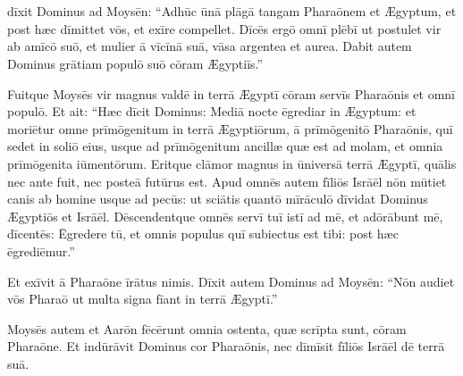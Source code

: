 \chapter{}


\thispagestyle{empty}

 dīxit Dominus ad Moysēn: ``Adhūc ūnā
plāgā tangam Pharaōnem et Ægyptum, et post
hæc dīmittet vōs, et exīre compellet. Dīcēs ergō omnī
plēbī ut postulet vir ab amīcō suō, et mulier ā
vīcīnā suā, vāsa argentea et aurea. Dabit autem Dominus
grātiam populō suō cōram Ægyptiīs.''

Fuitque Moysēs vir
magnus valdē in terrā Ægyptī cōram servīs Pharaōnis et omnī
populō. Et ait: ``Hæc dīcit Dominus: Mediā nocte ēgrediar in Ægyptum: 
et moriētur omne prīmōgenitum in terrā Ægyptiōrum, ā
prīmōgenitō Pharaōnis, quī sedet in soliō eius, usque ad
prīmōgenitum ancillæ quæ est ad molam, et omnia
prīmōgenita iūmentōrum. Eritque clāmor magnus
in ūniversā terrā Ægyptī, quālis nec ante fuit, nec posteā futūrus est. 
Apud omnēs autem fīliōs Isrāēl nōn mūtiet
canis ab homine usque ad pecūs: ut sciātis quantō mīrāculō
dīvidat Dominus Ægyptiōs et Isrāēl. Dēscendentque omnēs servī tuī istī ad
mē, et adōrābunt mē, dīcentēs: Ēgredere tū, et omnis populus quī
subiectus est tibi: post
hæc ēgrediēmur.''

Et exīvit ā Pharaōne īrātus nimis. Dīxit
autem Dominus ad Moysēn: ``Nōn audiet vōs Pharaō ut multa
signa fīant in terrā Ægyptī.''

Moysēs autem et Aarōn fēcērunt omnia
ostenta, quæ scrīpta sunt, cōram Pharaōne. Et indūrāvit Dominus cor Pharaōnis, nec dīmīsit fīliōs Isrāēl dē terrā
suā. 
